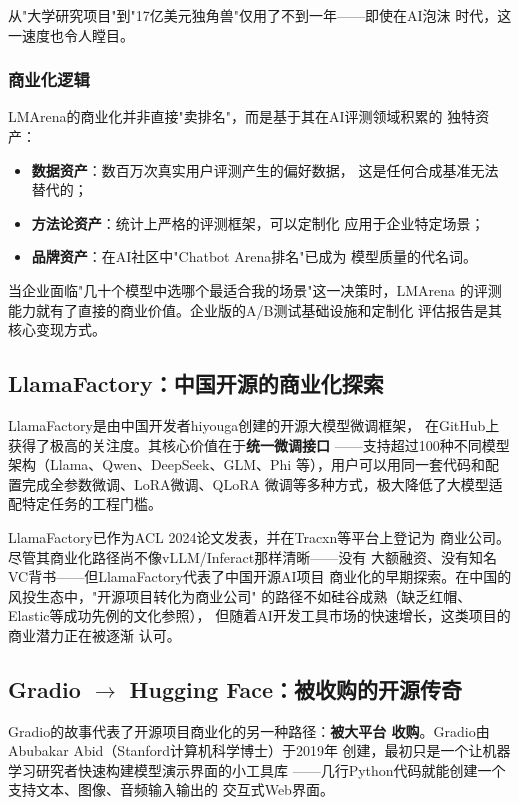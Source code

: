 从"大学研究项目"到"17亿美元独角兽"仅用了不到一年——即使在AI泡沫
时代，这一速度也令人瞠目。

\subsubsection{商业化逻辑}
LMArena的商业化并非直接"卖排名"，而是基于其在AI评测领域积累的
独特资产：
\begin{itemize}
  \item \textbf{数据资产}：数百万次真实用户评测产生的偏好数据，
    这是任何合成基准无法替代的；
  \item \textbf{方法论资产}：统计上严格的评测框架，可以定制化
    应用于企业特定场景；
  \item \textbf{品牌资产}：在AI社区中"Chatbot Arena排名"已成为
    模型质量的代名词。
\end{itemize}

当企业面临"几十个模型中选哪个最适合我的场景"这一决策时，LMArena
的评测能力就有了直接的商业价值。企业版的A/B测试基础设施和定制化
评估报告是其核心变现方式。

\subsection{LlamaFactory：中国开源的商业化探索}
\label{subsec:ch03-llamafactory}

LlamaFactory是由中国开发者hiyouga创建的开源大模型微调框架，
在GitHub上获得了极高的关注度。其核心价值在于\textbf{统一微调接口}
——支持超过100种不同模型架构（Llama、Qwen、DeepSeek、GLM、Phi
等），用户可以用同一套代码和配置完成全参数微调、LoRA微调、QLoRA
微调等多种方式，极大降低了大模型适配特定任务的工程门槛。

LlamaFactory已作为ACL 2024论文发表，并在Tracxn等平台上登记为
商业公司。尽管其商业化路径尚不像vLLM/Inferact那样清晰——没有
大额融资、没有知名VC背书——但LlamaFactory代表了中国开源AI项目
商业化的早期探索。在中国的风投生态中，"开源项目转化为商业公司"
的路径不如硅谷成熟（缺乏红帽、Elastic等成功先例的文化参照），
但随着AI开发工具市场的快速增长，这类项目的商业潜力正在被逐渐
认可。

\subsection{Gradio $\to$ Hugging Face：被收购的开源传奇}
\label{subsec:gradio}

Gradio的故事代表了开源项目商业化的另一种路径：\textbf{被大平台
收购}。Gradio由Abubakar Abid（Stanford计算机科学博士）于2019年
创建，最初只是一个让机器学习研究者快速构建模型演示界面的小工具库
——几行Python代码就能创建一个支持文本、图像、音频输入输出的
交互式Web界面。

